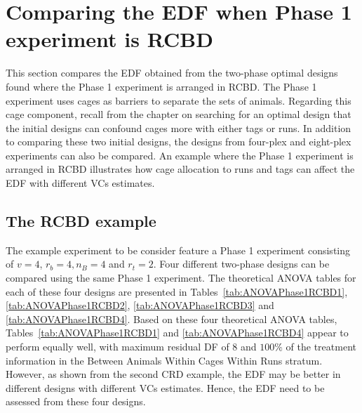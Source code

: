 \documentclass[12pt,a4paper]{article}
\begin{document}
\section{Comparing the EDF when Phase 1 experiment is RCBD}
\label{sec:expRCBD}
This section compares the EDF obtained from the two-phase optimal designs found where the Phase 1 experiment is arranged in RCBD. The Phase 1 experiment uses cages as barriers to separate the sets of animals. Regarding this cage component, recall from the chapter on searching for an optimal design that the initial designs can confound cages more with either tags or runs. In addition to comparing these two initial designs, the designs from four-plex and eight-plex experiments can also be compared. An example where the Phase 1 experiment is arranged in RCBD illustrates how cage allocation to runs and tags can affect the EDF with different VCs estimates.  

\subsection{The RCBD example} 
The example experiment to be consider feature a Phase 1 experiment consisting of $v = 4$, $r_b = 4, n_B  = 4$ and $r_t = 2$. Four different two-phase designs can be compared using the same Phase 1 experiment. The theoretical ANOVA tables for each of these four designs are presented in Tables~\ref{tab:ANOVAPhase1RCBD1}, \ref{tab:ANOVAPhase1RCBD2}, \ref{tab:ANOVAPhase1RCBD3} and \ref{tab:ANOVAPhase1RCBD4}. Based on these four theoretical ANOVA tables, Tables~\ref{tab:ANOVAPhase1RCBD1} and \ref{tab:ANOVAPhase1RCBD4} appear to perform equally well, with maximum residual DF of 8 and $100\%$ of the treatment information in the Between Animals Within Cages Within Runs stratum. However, as shown from the second CRD example, the EDF may be better in different designs with different VCs estimates. Hence, the EDF need to be assessed from these four designs. 
\end{document}
